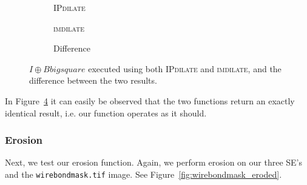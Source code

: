 \documentclass{article}
\begin{document}
\begin{figure}[H]
     \centering
     \begin{subfigure}[b]{0.3\textwidth}
         \centering
         
         \caption{\textsc{IPdilate}}
         \label{fig:wirebondmask_Bbigsquare_IPdilate}
     \end{subfigure}
     \hfill
     \begin{subfigure}[b]{0.3\textwidth}
         \centering
         
         \caption{\textsc{imdilate}}
         \label{fig:wirebondmask_Bbigsquare_imdilate}
     \end{subfigure}
     \hfill
     \begin{subfigure}[b]{0.3\textwidth}
         \centering
         
         \caption{Difference}
         \label{fig:wirebondmask_Bbigsquare_dilate_diff}
     \end{subfigure}
     
    \caption{$I \oplus Bbigsquare$ executed using both \textsc{IPdilate} and \textsc{imdilate}, and the difference between the two results.}
    \label{fig:wirebondmask_dilate_diff}
\end{figure}

In Figure~\ref{fig:wirebondmask_dilate_diff} it can easily be observed that the two functions return an exactly identical result, i.e. our function operates as it should.

\subsubsection*{Erosion}
Next, we test our erosion function. Again, we perform erosion on our three SE's and the \texttt{wirebondmask.tif} image. See Figure~\ref{fig:wirebondmask_eroded}.
\end{document}
